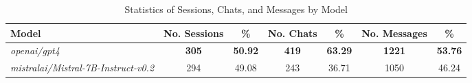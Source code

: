 
\begin{table}[H]
\centering
\scriptsize
\begin{tabular}{@{}lcccccc@{}}
\toprule
Model & No. Sessions & \% & No. Chats & \% & No. Messages & \% \\
\midrule
\textit{openai/gpt4} & \textbf{305} & \textbf{50.92} & \textbf{419} & \textbf{63.29} & \textbf{1221} & \textbf{53.76} \\
\textit{mistralai/Mistral-7B-Instruct-v0.2} & 294 & 49.08 & 243 & 36.71 & 1050 & 46.24 \\

\bottomrule
\end{tabular}
\caption{Statistics of Sessions, Chats, and Messages by Model}
\label{tab:sessions_chats_and_messages_by_model}
\end{table}
